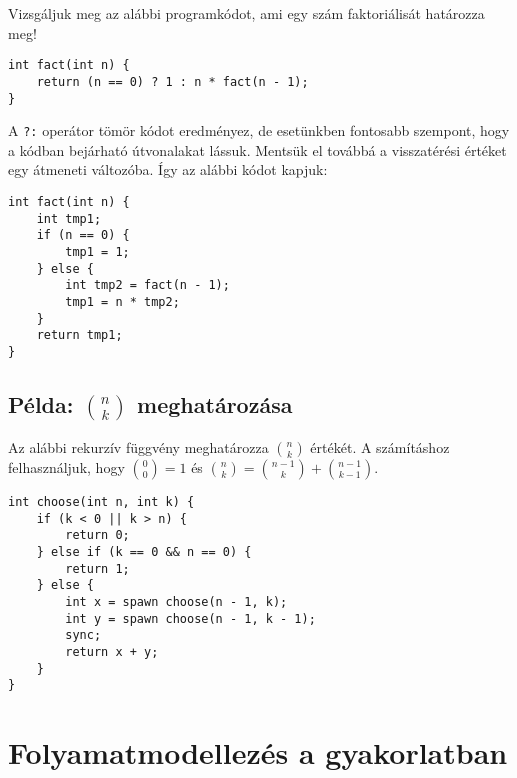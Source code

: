 Vizsgáljuk meg az alábbi programkódot, ami egy szám faktoriálisát határozza meg!

\begin{lstlisting}
int fact(int n) {
	return (n == 0) ? 1 : n * fact(n - 1);
}
\end{lstlisting}

A \lstinline{?:} operátor tömör kódot eredményez, de esetünkben fontosabb szempont, hogy a kódban bejárható útvonalakat lássuk. Mentsük el továbbá a visszatérési értéket egy átmeneti változóba. Így az alábbi kódot kapjuk:

\begin{minipage}{\balhasab}
\begin{lstlisting}
int fact(int n) {
	int tmp1;
	if (n == 0) {
		tmp1 = 1;
	} else {
		int tmp2 = fact(n - 1);
		tmp1 = n * tmp2;
	}
	return tmp1;
}
\end{lstlisting}
\end{minipage}
\begin{minipage}{\jobbhasab}
\end{minipage}

\subsection{Példa: $n \choose k$ meghatározása}

Az alábbi rekurzív függvény meghatározza $n \choose k$ értékét. A számításhoz felhasználjuk, hogy ${0 \choose 0} = 1$ és ${n \choose k} = {n-1 \choose k} + {n-1 \choose k-1}$.


\begin{minipage}{\balhasab}
\begin{lstlisting}
int choose(int n, int k) {
	if (k < 0 || k > n) {
		return 0;
	} else if (k == 0 && n == 0) {
		return 1;
	} else {
		int x = spawn choose(n - 1, k);
		int y = spawn choose(n - 1, k - 1);
		sync;
		return x + y;
	}
}
\end{lstlisting}
\end{minipage}
\begin{minipage}{\jobbhasab}
\end{minipage}



\section{Folyamatmodellezés a gyakorlatban}

